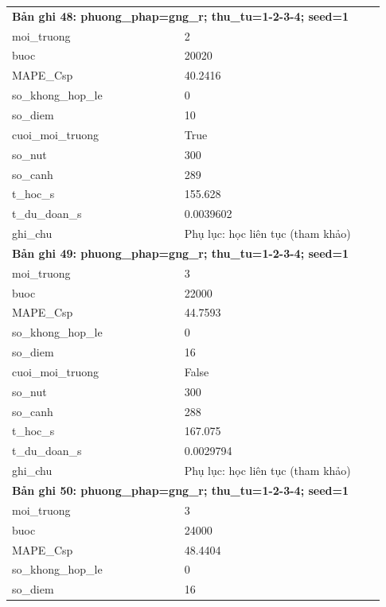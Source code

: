\begin{longtable}{p{0.43\linewidth}p{0.50\linewidth}}
\midrule
\multicolumn{2}{p{0.95\linewidth}}{\textbf{Bản ghi 48: phuong\_phap=gng\_r; thu\_tu=1-2-3-4; seed=1}} \\
moi\_\allowbreak truong & 2 \\
buoc & 20020 \\
MAPE\_\allowbreak Csp & 40.2416 \\
so\_\allowbreak khong\_\allowbreak hop\_\allowbreak le & 0 \\
so\_\allowbreak diem & 10 \\
cuoi\_\allowbreak moi\_\allowbreak truong & True \\
so\_\allowbreak nut & 300 \\
so\_\allowbreak canh & 289 \\
t\_\allowbreak hoc\_\allowbreak s & 155.628 \\
t\_\allowbreak du\_\allowbreak doan\_\allowbreak s & 0.0039602 \\
ghi\_\allowbreak chu & Phụ lục: học liên tục (tham khảo) \\
\midrule
\multicolumn{2}{p{0.95\linewidth}}{\textbf{Bản ghi 49: phuong\_phap=gng\_r; thu\_tu=1-2-3-4; seed=1}} \\
moi\_\allowbreak truong & 3 \\
buoc & 22000 \\
MAPE\_\allowbreak Csp & 44.7593 \\
so\_\allowbreak khong\_\allowbreak hop\_\allowbreak le & 0 \\
so\_\allowbreak diem & 16 \\
cuoi\_\allowbreak moi\_\allowbreak truong & False \\
so\_\allowbreak nut & 300 \\
so\_\allowbreak canh & 288 \\
t\_\allowbreak hoc\_\allowbreak s & 167.075 \\
t\_\allowbreak du\_\allowbreak doan\_\allowbreak s & 0.0029794 \\
ghi\_\allowbreak chu & Phụ lục: học liên tục (tham khảo) \\
\midrule
\multicolumn{2}{p{0.95\linewidth}}{\textbf{Bản ghi 50: phuong\_phap=gng\_r; thu\_tu=1-2-3-4; seed=1}} \\
moi\_\allowbreak truong & 3 \\
buoc & 24000 \\
MAPE\_\allowbreak Csp & 48.4404 \\
so\_\allowbreak khong\_\allowbreak hop\_\allowbreak le & 0 \\
so\_\allowbreak diem & 16 \\

\end{longtable}

